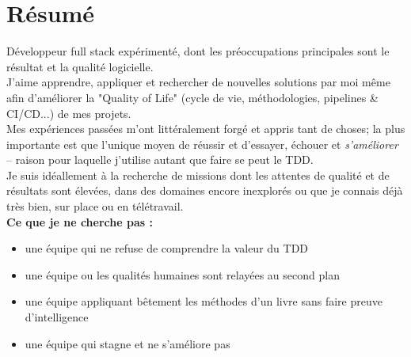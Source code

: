 \documentclass[]{friggeri-cv}
\begin{document}
\section{Résumé}
Développeur full stack expérimenté, dont les préoccupations principales sont le résultat et la qualité logicielle.\\
J'aime apprendre, appliquer et rechercher de nouvelles solutions par moi même afin d'améliorer la "Quality of Life" (cycle de vie, méthodologies, pipelines \& CI/CD...) de mes projets.\\
Mes expériences passées m'ont littéralement forgé et appris tant de choses; la plus importante est que l'unique moyen de réussir et d'essayer, échouer et \textit{s'améliorer} -- raison pour laquelle j'utilise autant que faire se peut le TDD.\\
Je suis idéallement à la recherche de missions dont les attentes de qualité et de résultats sont élevées, dans des domaines encore inexplorés ou que je connais déjà très bien, sur place ou en télétravail.\\
\textbf{Ce que je ne cherche pas :}
\begin{itemize}
\item une équipe qui ne refuse de comprendre la valeur du TDD
\vspace{-\baselineskip}
\vspace{1 ex}
\item une équipe ou les qualités humaines sont relayées au second plan
\vspace{-\baselineskip}
\vspace{1 ex}
\item une équipe appliquant bêtement les méthodes d'un livre sans faire preuve d'intelligence
\vspace{-\baselineskip}
\vspace{-\baselineskip}
\vspace{1 ex}
\item une équipe qui stagne et ne s'améliore pas
\end{itemize}
\end{document}
